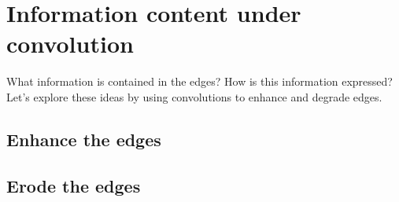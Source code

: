 \clearpage
\section{Information content under convolution}

What information is contained in the edges? How is this information expressed? Let's explore these ideas by using convolutions to enhance and degrade edges.

\subsection{Enhance the edges}



\subsection{Erode the edges}



\endinput